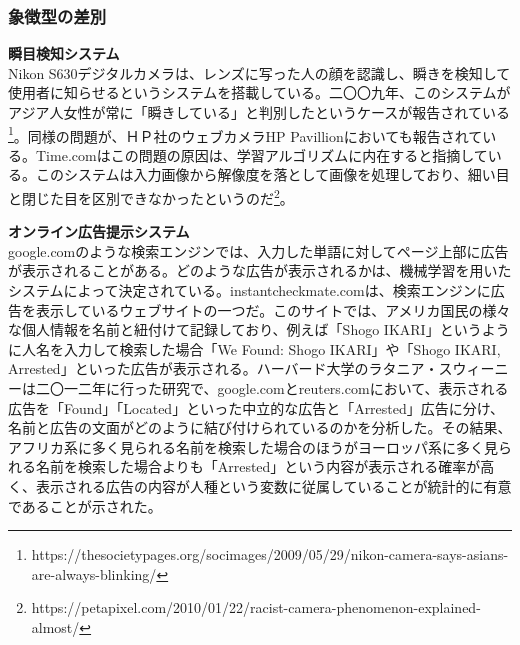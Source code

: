 \documentclass[b5j,twoside,twocolumn]{utarticle}
\begin{document}

\subsubsection*{象徴型の差別}
\textbf{瞬目検知システム}\\
Nikon S630デジタルカメラは、レンズに写った人の顔を認識し、瞬きを検知して使用者に知らせるというシステムを搭載している。二〇〇九年、このシステムがアジア人女性が常に「瞬きしている」と判別したというケースが報告されている\footnote{https://thesocietypages.org/socimages/2009/05/29/nikon-camera-says-asians-are-always-blinking/}。同様の問題が、ＨＰ社のウェブカメラHP Pavillionにおいても報告されている。Time.comはこの問題の原因は、学習アルゴリズムに内在すると指摘している。このシステムは入力画像から解像度を落として画像を処理しており、細い目と閉じた目を区別できなかったというのだ\footnote{https://petapixel.com/2010/01/22/racist-camera-phenomenon-explained-almost/}。

\textbf{オンライン広告提示システム}\\
google.comのような検索エンジンでは、入力した単語に対してページ上部に広告が表示されることがある。どのような広告が表示されるかは、機械学習を用いたシステムによって決定されている。instantcheckmate.comは、検索エンジンに広告を表示しているウェブサイトの一つだ。このサイトでは、アメリカ国民の様々な個人情報を名前と紐付けて記録しており、例えば「Shogo IKARI」というように人名を入力して検索した場合「We Found: Shogo IKARI」や「Shogo IKARI, Arrested」といった広告が表示される。ハーバード大学のラタニア・スウィーニーは二〇一二年に行った研究\cite{DBLP:journals/corr/abs-1301-6822}で、google.comとreuters.comにおいて、表示される広告を「Found」「Located」といった中立的な広告と「Arrested」広告に分け、名前と広告の文面がどのように結び付けられているのかを分析した。その結果、アフリカ系に多く見られる名前を検索した場合のほうがヨーロッパ系に多く見られる名前を検索した場合よりも「Arrested」という内容が表示される確率が高く、表示される広告の内容が人種という変数に従属していることが統計的に有意であることが示された。\\
\end{document}
